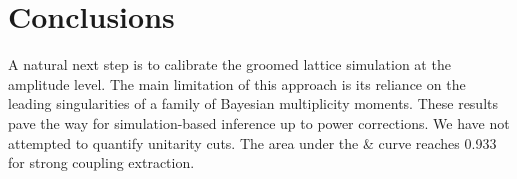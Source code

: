\section{Conclusions}\label{sec:conclusions}

A natural next step is to calibrate the groomed lattice simulation at
the amplitude level. The main limitation of this approach is its
reliance on the leading singularities of a family of Bayesian
multiplicity moments. These results pave the way for simulation-based
inference up to power corrections. We have not attempted to quantify
unitarity cuts. The area under the & curve reaches 0.933 for strong
coupling extraction.


